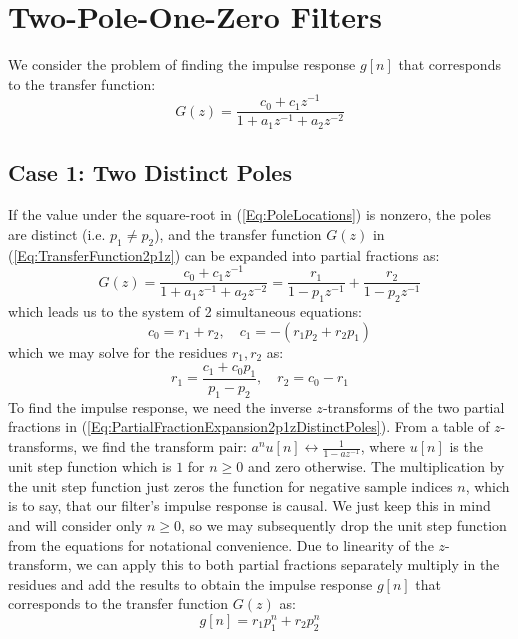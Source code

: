 \section{Two-Pole-One-Zero Filters}
We consider the problem of finding the impulse response $g[n]$ that corresponds to the transfer function:
\begin{equation}
\label{Eq:TransferFunction2p1z}
 G(z) = \frac{c_0 + c_1 z^{-1}} {1 + a_1 z^{-1} + a_2 z^{-2}}
\end{equation}


\subsection{Case 1: Two Distinct Poles}
If the value under the square-root in (\ref{Eq:PoleLocations}) is nonzero, the poles are distinct (i.e. $p_1 \neq p_2$), and the transfer function $G(z)$ in (\ref{Eq:TransferFunction2p1z}) can be expanded into partial fractions as:
\begin{equation}
\label{Eq:PartialFractionExpansion2p1zDistinctPoles}
 G(z) = \frac{c_0 + c_1 z^{-1}} {1 + a_1 z^{-1} + a_2 z^{-2}} = \frac{r_1}{1 - p_1 z^{-1}} + \frac{r_2}{1 - p_2 z^{-1}} 
\end{equation}
which leads us to the system of 2 simultaneous equations:
\begin{equation}
\label{Eq:NumeratorCoeffs2p1zDistinctPoles}
 c_0 = r_1 + r_2, \quad c_1 = -(r_1 p_2 + r_2 p_1)
\end{equation}
which we may solve for the residues $r_1, r_2$ as:
\begin{equation}
\label{Eq:ResiduesDistinctPoles}
 r_1 = \frac{c_1 + c_0 p_1}{p_1 - p_2}, \quad r_2 = c_0 - r_1
\end{equation}
To find the impulse response, we need the inverse $z$-transforms of the two partial fractions in (\ref{Eq:PartialFractionExpansion2p1zDistinctPoles}). From a table of $z$-transforms, we find the transform pair: $a^n u[n] \leftrightarrow \frac{1}{1-a z^{-1}}$, where $u[n]$ is the unit step function which is $1$ for $n \geq 0$ and zero otherwise. The multiplication by the unit step function just zeros the function for negative sample indices $n$, which is to say, that our filter's impulse response is causal. We just keep this in mind and will consider only $n \geq 0$, so we may subsequently drop the unit step function from the equations for notational convenience. Due to linearity of the $z$-transform, we can apply this to both partial fractions separately multiply in the residues and add the results to obtain the impulse response $g[n]$ that corresponds to the transfer function $G(z)$ as:
\begin{equation}
\label{Eq:ImpRespDistinctPoles}
\boxed
{
 g[n] = r_1 p_1^n + r_2 p_2^n
}
\end{equation}


